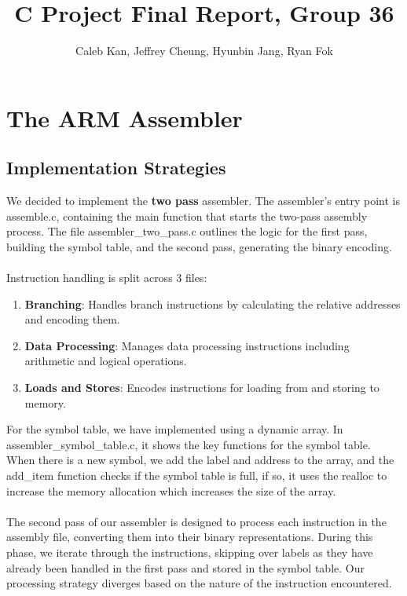 \documentclass[10pt]{article}
\begin{document}
\title{C Project Final Report, Group 36}
\author{Caleb Kan, Jeffrey Cheung, Hyunbin Jang, Ryan Fok}

\maketitle

\section{The ARM Assembler}
\subsection{Implementation Strategies}
We decided to implement the \textbf{two pass} assembler. The assembler's entry point is assemble.c, containing the main function that starts the two-pass assembly process. The file assembler\_two\_pass.c outlines the logic for the first pass, building the symbol table, and the second pass, generating the binary encoding. \\
\\
Instruction handling is split across 3 files:
\begin{enumerate}
    \item \textbf{Branching}: Handles branch instructions by calculating the relative addresses and encoding them.
    \item \textbf{Data Processing}: Manages data processing instructions including arithmetic and logical operations. 
    \item \textbf{Loads and Stores}: Encodes instructions for loading from and storing to memory. 
\end{enumerate}
For the symbol table, we have implemented using a dynamic array. In assembler\_symbol\_table.c, it shows the key functions for the symbol table. When there is a new symbol, we add the label and address to the array, and the add\_item function checks if the symbol table is full, if so, it uses the realloc to increase the memory allocation which increases the size of the array. \\
\\
The second pass of our assembler is designed to process each instruction in the assembly file, converting them into their binary representations. During this phase, we iterate through the instructions, skipping over labels as they have already been handled in the first pass and stored in the symbol table. Our processing strategy diverges based on the nature of the instruction encountered. \\ 
\end{document}
